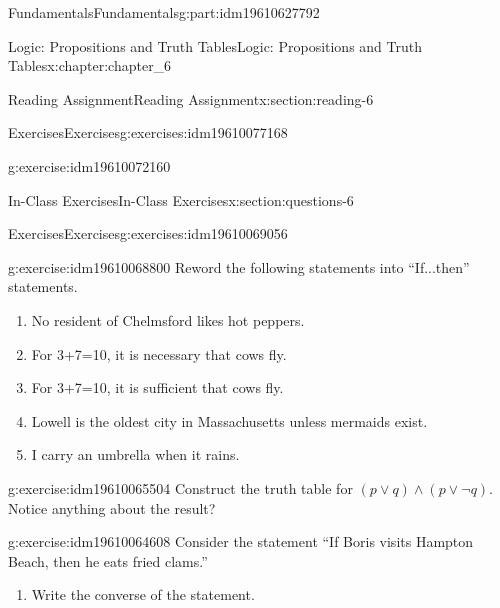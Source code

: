 \documentclass[oneside,10pt,]{book}
\numberwithin{equation}{section}
\begin{document}
\begin{partptx}{Fundamentals}{}{Fundamentals}{}{}{g:part:idm19610627792}
\begin{chapterptx}{Logic: Propositions and Truth Tables}{}{Logic: Propositions and Truth Tables}{}{}{x:chapter:chapter_6}
\begin{sectionptx}{Reading Assignment}{}{Reading Assignment}{}{}{x:section:reading-6}
\begin{exercises-subsection-numberless}{Exercises}{}{Exercises}{}{}{g:exercises:idm19610077168}
\begin{exercisegroup}
\begin{divisionexerciseeg}{2}{}{}{g:exercise:idm19610072160}
\begin{multicols}{2}
\begin{enumerate}[label=(\alph*)]
\end{enumerate}
\end{multicols}
%
\end{divisionexerciseeg}%
\end{exercisegroup}
\par\medskip\noindent
\end{exercises-subsection-numberless}
\end{sectionptx}
%
%
\typeout{************************************************}
\typeout{************************************************}
%
\begin{sectionptx}{In-Class Exercises}{}{In-Class Exercises}{}{}{x:section:questions-6}
%
%
%
\typeout{************************************************}
\typeout{************************************************}
%
\begin{exercises-subsection-numberless}{Exercises}{}{Exercises}{}{}{g:exercises:idm19610069056}
\par\medskip\noindent%
%
\begin{exercisegroup}
\begin{divisionexerciseeg}{1}{}{}{g:exercise:idm19610068800}%
Reword the following statements into ``If...then'' statements.%
\begin{enumerate}[label=(\alph*)]
\item{}No resident of Chelmsford likes hot peppers.%
\item{}For 3+7=10, it is necessary that cows fly.%
\item{}For 3+7=10, it is sufficient that cows fly.%
\item{}Lowell is the oldest city in Massachusetts unless mermaids exist.%
\item{}I carry an umbrella when it rains.%
\end{enumerate}
%
\end{divisionexerciseeg}%
\begin{divisionexerciseeg}{2}{}{}{g:exercise:idm19610065504}%
Construct the truth table for \((p \lor q) \land (p\lor \neg q)\).   Notice anything about the result?%
\end{divisionexerciseeg}%
\begin{divisionexerciseeg}{3}{}{}{g:exercise:idm19610064608}%
Consider the statement “If Boris visits Hampton Beach, then he eats fried clams.”%
\begin{enumerate}[label=(\alph*)]
\item{}Write the converse of the statement.%

\end{enumerate}
\end{divisionexerciseeg}
\end{exercisegroup}
\end{exercises-subsection-numberless}
\end{sectionptx}
\end{chapterptx}
\end{partptx}
\end{document}
